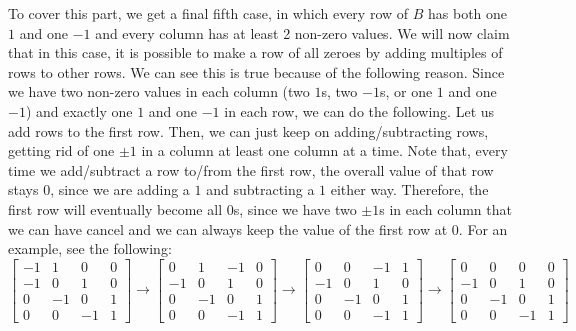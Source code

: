\documentclass{article}
\begin{document}
\begin{description}
        To cover this part, we get a final fifth case, in which every row of $B$ has
        both one $1$ and one $-1$ and every column has at least 2 non-zero
        values. We will now claim that in this case, it is possible to make a row of
        all zeroes by adding multiples of rows to other rows. We
        can see this is true because of the following reason. Since we have two
        non-zero values in each column (two $1$s, two $-1$s, or
        one $1$ and one $-1$) and exactly one $1$ and one $-1$ in each row,
        we can do the following. Let us add rows to the
        first row. Then, we can just keep on adding/subtracting rows, getting rid of one
        $\pm1$ in a column at least one column at a time. Note that, every time we
        add/subtract a row to/from the first row, the overall value of that row
        stays 0, since we are adding a $1$ and subtracting a $1$ either
        way. Therefore, the first row will eventually become all $0$s,
        since we have two $\pm1$s in each column that we can have cancel
        and we can always keep the value of the first row at $0$.
        For an example, see the following:
        \[
        \begin{bmatrix}
        -1 & 1 & 0 & 0\\
        -1 & 0 & 1 & 0\\
         0 & -1 & 0 & 1\\
         0 & 0 & -1 & 1
        \end{bmatrix} \rightarrow
        \begin{bmatrix}
         0 & 1 & -1 & 0\\
        -1 & 0 & 1 & 0\\
         0 & -1 & 0 & 1\\
         0 & 0 & -1 & 1
        \end{bmatrix} \rightarrow
        \begin{bmatrix}
         0 & 0 & -1 & 1\\
        -1 & 0 & 1 & 0\\
         0 & -1 & 0 & 1\\
         0 & 0 & -1 & 1
        \end{bmatrix} \rightarrow
        \begin{bmatrix}
         0 & 0 & 0 & 0\\
        -1 & 0 & 1 & 0\\
         0 & -1 & 0 & 1\\
         0 & 0 & -1 & 1
        \end{bmatrix}
        \]

\end{description}
\end{document}
